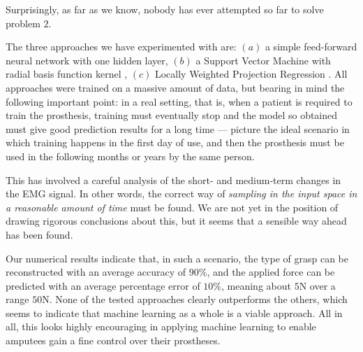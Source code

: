 Surprisingly, as far as we know, nobody has ever attempted so far to
solve problem $2$.

The three approaches we have experimented with are: $(a)$ a simple
feed-forward neural network with one hidden layer, $(b)$ a Support
Vector Machine with radial basis function kernel \cite{BGV92}, $(c)$
Locally Weighted Projection Regression \cite{lwpr}. All approaches
were trained on a massive amount of data, but bearing in mind the
following important point: in a real setting, that is, when a patient
is required to train the prosthesis, training must eventually stop and
the model so obtained must give good prediction results for a long
time --- picture the ideal scenario in which training happens in the
first day of use, and then the prosthesis must be used in the
following months or years by the same person.

This has involved a careful analysis of the short- and medium-term
changes in the EMG signal. In other words, the correct way of
\emph{sampling in the input space in a reasonable amount of time} must
be found. We are not yet in the position of drawing rigorous
conclusions about this, but it seems that a sensible way ahead has
been found.

Our numerical results indicate that, in such a scenario, the type of
grasp can be reconstructed with an average accuracy of $90\%$, and the
applied force can be predicted with an average percentage error of
$10\%$, meaning about $5$N over a range $50$N. None of the tested
approaches clearly outperforms the others, which seems to indicate
that machine learning as a whole is a viable approach. All in all,
this looks highly encouraging in applying machine learning to enable
amputees gain a fine control over their prostheses.
